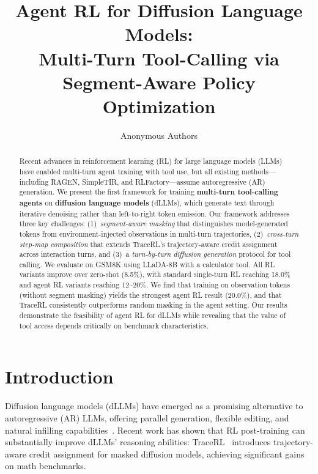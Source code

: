 \documentclass{article}
\title{Agent RL for Diffusion Language Models:\\Multi-Turn Tool-Calling via Segment-Aware Policy Optimization}
\author{
  Anonymous Authors
}
\date{}
\begin{document}
\maketitle

\begin{abstract}
Recent advances in reinforcement learning (RL) for large language models (LLMs) have enabled multi-turn agent training with tool use, but all existing methods---including RAGEN, SimpleTIR, and RLFactory---assume autoregressive (AR) generation. We present the first framework for training \textbf{multi-turn tool-calling agents} on \textbf{diffusion language models} (dLLMs), which generate text through iterative denoising rather than left-to-right token emission. Our framework addresses three key challenges: (1)~\emph{segment-aware masking} that distinguishes model-generated tokens from environment-injected observations in multi-turn trajectories, (2)~\emph{cross-turn step-map composition} that extends TraceRL's trajectory-aware credit assignment across interaction turns, and (3)~a \emph{turn-by-turn diffusion generation} protocol for tool calling. We evaluate on GSM8K using LLaDA-8B with a calculator tool. All RL variants improve over zero-shot (8.5\%), with standard single-turn RL reaching 18.0\% and agent RL variants reaching 12--20\%. We find that training on observation tokens (without segment masking) yields the strongest agent RL result (20.0\%), and that TraceRL consistently outperforms random masking in the agent setting. Our results demonstrate the feasibility of agent RL for dLLMs while revealing that the value of tool access depends critically on benchmark characteristics.
\end{abstract}

\section{Introduction}

Diffusion language models (dLLMs) have emerged as a promising alternative to autoregressive (AR) LLMs, offering parallel generation, flexible editing, and natural infilling capabilities~\citep{austin2021d3pm, lou2024mdlm, nie2025llada}. Recent work has shown that RL post-training can substantially improve dLLMs' reasoning abilities: TraceRL~\citep{tracerl2025} introduces trajectory-aware credit assignment for masked diffusion models, achieving significant gains on math benchmarks.
\end{document}
